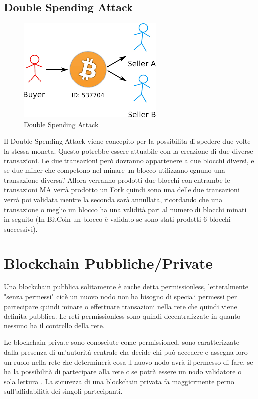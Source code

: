 \documentclass[12pt,titlepage]{report}
\begin{document}
\subsection{Double Spending Attack}
\begin{figure}[h]
	\includegraphics[height=0.2\textheight]{dsa}
	\centering
	\caption{Double Spending Attack}
	\label{fig:ds-attack}
\end{figure}
Il Double Spending Attack viene concepito per la possibilita di spedere due volte la stessa moneta. Questo potrebbe essere attuabile con la creazione di due diverse transazioni. Le due transazioni però dovranno appartenere a due blocchi diversi, e se due miner che competono nel minare un blocco utilizzano ognuno una transazione diversa? Allora verranno prodotti due blocchi con entrambe le transazioni MA verrà prodotto un Fork quindi sono una delle due transazioni verrà poi validata mentre la seconda sarà annullata, ricordando che una transazione o meglio un blocco ha una validità pari al numero di blocchi minati in seguito (In BitCoin un blocco è validato se sono stati prodotti 6 blocchi successivi).

\section{Blockchain Pubbliche/Private}
Una blockchain pubblica solitamente è anche detta permissionless, letteralmente "senza permessi" cioè un nuovo nodo non ha bisogno di speciali permessi per partecipare quindi minare o effettuare transazioni nella rete che quindi viene definita pubblica. Le reti permissionless sono quindi decentralizzate in quanto nessuno ha il controllo della rete.

Le blockchain private sono conosciute come permissioned, sono caratterizzate dalla presenza di un’autorità centrale che decide chi può accedere e assegna loro un ruolo nella rete che determinerà cosa il nuovo nodo avrà il permesso di fare, se ha la possibilità di partecipare alla rete o se potrà essere un nodo validatore o sola lettura . La sicurezza di una blockchain privata fa maggiormente perno sull'affidabilità dei singoli partecipanti.
\end{document}
